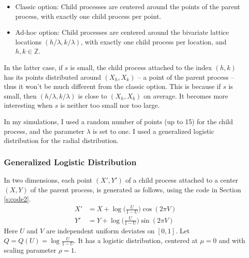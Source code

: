 \documentclass[10pt]{article}
\begin{document}
\begin{itemize}
\item Classic option: Child processes are centered around the points of the parent process, with exactly one child process per point.
\item Ad-hoc option: Child processes are centered around the bivariate lattice locations $(h/\lambda,k/\lambda)$, with exactly one child process per location, and $h,k\in \mathbb{Z}$.
\end{itemize}
In the latter case, if $s$ is small, the child process attached to the index $(h,k)$ has its points distributed around $(X_h, X_k)$ -- a point of the parent process -- thus it won't be much different from the classic option. This is because if $s$ is small, then $(h/\lambda,k/\lambda)$ is close to $(X_h, X_k)$ on average. It becomes more interesting when $s$ is neither too small nor too large.

In my simulations, I used a random number of points (up to 15) for the child process, and the parameter $\lambda$ is set to one. I used a generalized logistic distribution for the radial distribution.

\subsubsection{Generalized Logistic Distribution}\label{sec:gld}

In two dimensions, each point $(X', Y')$ of a child process attached to a center $(X, Y)$ of the parent process, is generated as follows, using the code in Section \ref{s:code2}.
\begin{align}
X' & = X + \log\Big(\frac{U}{1-U}\Big) \cos(2\pi V)\label{hlog1}\\
Y' & = Y + \log\Big(\frac{U}{1-U}\Big) \sin(2\pi V)\label{hlog2}
\end{align}
Here $U$ and $V$ are independent uniform deviates on $[0, 1]$. Let $Q = Q(U)=\log\frac{U}{1-U}$. It has a logistic distribution, centered at $\mu=0$ and with scaling parameter $\rho=1$. 
\end{document}

